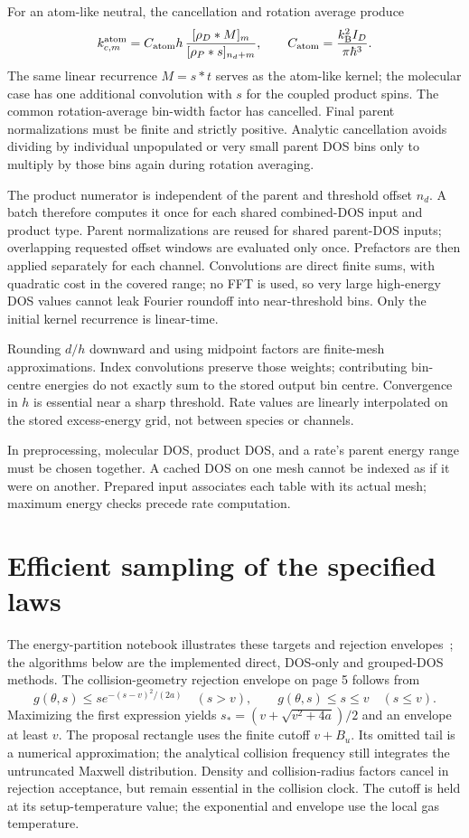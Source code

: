 \documentclass[10pt,a4paper]{article}
\newcommand{\kb}{k_{\mathrm B}}
\begin{document}
For an atom-like neutral, the cancellation and rotation average produce
\[
 k_{c,m}^{\rm atom}=C_{\rm atom}h\,
 \frac{[\rho_D*M]_m}{[\rho_P*s]_{n_d+m}},\qquad
 C_{\rm atom}=\frac{\kb^2I_D}{\pi\hbar^3}.
\]
The same linear recurrence $M=s*t$ serves as the atom-like kernel; the
molecular case has one additional convolution with $s$ for the coupled
product spins. The common rotation-average bin-width factor has cancelled.
Final parent normalizations must be finite and strictly positive. Analytic
cancellation avoids dividing by individual unpopulated or very small parent
DOS bins only to multiply by those bins again during rotation averaging.

The product numerator is independent of the parent and threshold offset
$n_d$. A batch therefore computes it once for each shared combined-DOS input
and product type. Parent normalizations are reused for shared parent-DOS
inputs; overlapping requested offset windows are evaluated only once.
Prefactors are then applied separately for each channel. Convolutions are
direct finite sums, with quadratic cost in the covered range; no FFT is used,
so very large high-energy DOS values cannot leak Fourier roundoff into
near-threshold bins. Only the initial kernel recurrence is linear-time.

Rounding $d/h$ downward and using midpoint factors are finite-mesh
approximations. Index convolutions preserve those weights; contributing
bin-centre energies do not exactly sum to the stored output bin centre.
Convergence in $h$ is essential near a sharp threshold. Rate values are
linearly interpolated on the stored excess-energy grid, not between species
or channels.

In preprocessing, molecular DOS, product DOS, and a rate's parent energy range
must be chosen together. A cached DOS on one mesh cannot be indexed as if it
were on another. Prepared input associates each table with its actual mesh;
maximum energy checks precede rate computation.

\clearpage
\section{Efficient sampling of the specified laws}\label{app:sampling}
The energy-partition notebook illustrates these targets and rejection
envelopes~\cite{vibnotebook}; the algorithms below are the implemented direct,
DOS-only and grouped-DOS methods.
The collision-geometry rejection envelope on page 5 follows from
\[
 g(\theta,s)\leq s e^{-(s-v)^2/(2a)}\quad(s>v),
 \qquad g(\theta,s)\leq s\leq v\quad(s\leq v).
\]
Maximizing the first expression yields
$s_*=(v+\sqrt{v^2+4a})/2$ and an envelope at least $v$.
The proposal rectangle uses the finite cutoff $v+B_u$. Its omitted tail is a
numerical approximation; the analytical collision frequency still integrates
the untruncated Maxwell distribution. Density and collision-radius factors
cancel in rejection acceptance, but remain essential in the collision clock.
The cutoff is held at its setup-temperature value; the exponential and
envelope use the local gas temperature.
\end{document}
